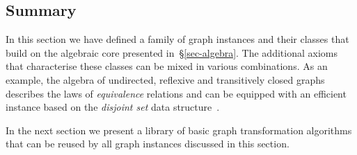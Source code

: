 \subsection{Summary}

In this section we have defined a family of graph instances and their classes that
build on the algebraic core presented in~\S\ref{sec-algebra}. The additional axioms
that characterise these classes
can be mixed in various combinations. As an example, the algebra of undirected, reflexive
and transitively closed graphs describes the laws of \emph{equivalence} relations and can be
equipped with an
efficient instance based on the \emph{disjoint set} data structure~\cite{1984_set_union_tarjan}.

In the next section we present a library of basic graph transformation algorithms that
can be reused by all graph instances discussed in this section.
